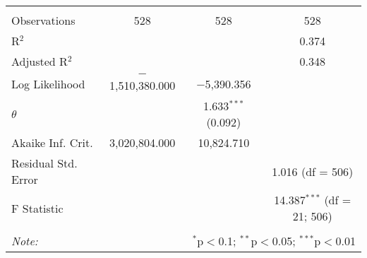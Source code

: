\begin{table}[!htbp]
\begin{tabular}{@{\extracolsep{5pt}}lccc}
 \hline \\[-1.8ex] 
Observations & 528 & 528 & 528 \\ 
R$^{2}$ &  &  & 0.374 \\ 
Adjusted R$^{2}$ &  &  & 0.348 \\ 
Log Likelihood & $-$1,510,380.000 & $-$5,390.356 &  \\ 
$\theta$ &  & 1.633$^{***}$  (0.092) &  \\ 
Akaike Inf. Crit. & 3,020,804.000 & 10,824.710 &  \\ 
Residual Std. Error &  &  & 1.016 (df = 506) \\ 
F Statistic &  &  & 14.387$^{***}$ (df = 21; 506) \\ 
\hline 
\hline \\[-1.8ex] 
\textit{Note:}  & \multicolumn{3}{r}{$^{*}$p$<$0.1; $^{**}$p$<$0.05; $^{***}$p$<$0.01} \\ 
\end{tabular} 
\end{table} 
